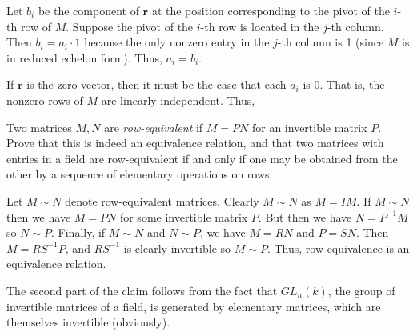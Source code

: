 \documentclass[../../master.tex]{subfiles}
\begin{document}
\begin{solution}
    Let $b_i$ be the component of $\bm{r}$ at the position corresponding to the pivot of the $i$-th row of $M$.
    Suppose the pivot of the $i$-th row is located in the $j$-th column.
    Then $b_i = a_i \cdot 1$ because the only nonzero entry in the $j$-th column is 1 (since $M$ is in reduced echelon form).
    Thus, $a_i = b_i$.

    If $\bm{r}$ is the zero vector, then it must be the case that each $a_i$ is 0. 
    That is, the nonzero rows of $M$ are linearly independent.
    Thus, 
\end{solution}

\begin{problem}
    Two matrices $M, N$ are \textit{row-equivalent} if $M = PN$ for an invertible matrix $P$.
    Prove that this is indeed an equivalence relation, and that two matrices with entries in a field are row-equivalent if and only if one may be obtained from the other by a sequence of elementary operations on rows.
\end{problem}

\begin{solution}
    Let $M \sim N$ denote row-equivalent matrices.
    Clearly $M \sim N$ as $M = IM$.
    If $M \sim N$ then we have $M = PN$ for some invertible matrix $P$.
    But then we have $N = P^{-1} M$ so $N \sim P$.
    Finally, if $M \sim N$ and $N \sim P$, we have $M = RN$ and $P = SN$.
    Then $M = RS^{-1}P$, and $RS^{-1}$ is clearly invertible so $M \sim P$.
    Thus, row-equivalence is an equivalence relation.

    The second part of the claim follows from the fact that $GL_n(k)$, the group of invertible matrices of a field, is generated by elementary matrices, which are themselves invertible (obviously).
\end{solution}
\end{document}
